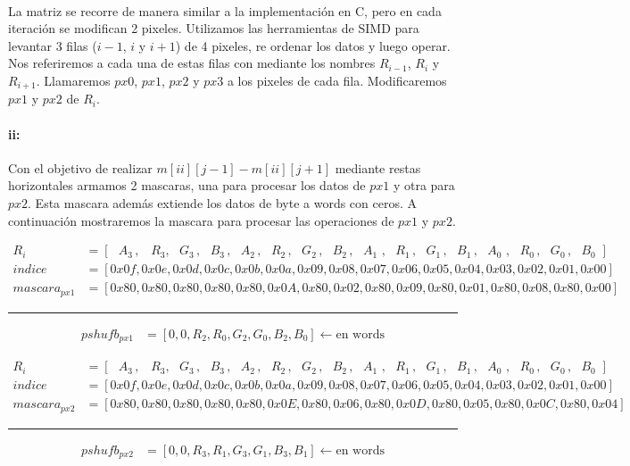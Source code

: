 \documentclass[a4paper]{article}
\begin{document}
\paragraph{} La matriz se recorre de manera similar a la implementaci\'on en C, pero en cada iteraci\'on se modifican 2 pixeles. Utilizamos las herramientas de SIMD para levantar 3 filas ($i-1$, $i$ y $i+1$) de 4 pixeles, re ordenar los datos y luego operar. Nos referiremos a cada una de estas filas con mediante los nombres $R_{i-1}$, $R_i$ y $R_{i+1}$. Llamaremos $px0$, $px1$, $px2$ y $px3$ a los pixeles de cada fila. Modificaremos $px1$ y $px2$ de $R_i$.

\paragraph{ii:} Con el objetivo de realizar $m[ii][j-1] - m[ii][j+1]$ mediante restas horizontales armamos 2 mascaras, una para procesar los datos de $px1$ y otra para $px2$. Esta mascara adem\'as extiende los datos de byte a words con ceros. A continuaci\'on mostraremos la mascara para procesar las operaciones de $px1$ y $px2$.
 


\begin{align*}
	R_i &= [\, \, \, \, A_3 \, ,\, \, \, \, \, R_3 ,\, \, \, \, G_3 \, ,\, \, \, \, B_3 \, ,\, \, \, \, A_2 \, ,\, \, \, \, R_2 \, ,\, \, \, \, G_2 \, ,\, \, \, \, B_2 \, , \, \, \, \,  A_1 \, \, , \, \, \, \, R_1 \, , \, \, \, \, G_1 \, , \, \, \, \, B_1 \, , \, \, \, \, A_0 \, \, , \, \, \, \, R_0 \, , \, \, \, \, G_0 \, , \, \, \, \, B_0 \, \,]\\
	indice &= [0x0f, 0x0e, 0x0d, 0x0c, 0x0b, 0x0a, 0x09, 0x08, 0x07, 0x06, 0x05, 0x04, 0x03, 0x02, 0x01, 0x00]\\
	mascara_{px1} &= [0x80, 0x80, 0x80, 0x80, 0x80, 0x0A, 0x80, 0x02, 0x80, 0x09, 0x80, 0x01, 0x80, 0x08, 0x80, 0x00] 
\end{align*}
\hrule
\begin{align*}
	pshufb_{px1} &= [0, 0, R_2, R_0, G_2, G_0, B_2, B_0] \leftarrow \text{en words}
\end{align*} 


\begin{align*}
	R_i &= [\, \, \, \, A_3 \, ,\, \, \, \, \, R_3 ,\, \, \, \, G_3 \, ,\, \, \, \, B_3 \, ,\, \, \, \, A_2 \, ,\, \, \, \, R_2 \, ,\, \, \, \, G_2 \, ,\, \, \, \, B_2 \, , \, \, \, \,  A_1 \, \, , \, \, \, \, R_1 \, , \, \, \, \, G_1 \, , \, \, \, \, B_1 \, , \, \, \, \, A_0 \, \, , \, \, \, \, R_0 \, , \, \, \, \, G_0 \, , \, \, \, \, B_0 \, \,]\\
	indice &= [0x0f, 0x0e, 0x0d, 0x0c, 0x0b, 0x0a, 0x09, 0x08, 0x07, 0x06, 0x05, 0x04, 0x03, 0x02, 0x01, 0x00]\\
	mascara_{px2} &= [0x80, 0x80, 0x80, 0x80, 0x80, 0x0E, 0x80, 0x06, 0x80, 0x0D, 0x80, 0x05, 0x80, 0x0C, 0x80, 0x04] 
\end{align*}
\hrule
\begin{align*}
	pshufb_{px2} &= [0, 0, R_3, R_1, G_3, G_1, B_3, B_1] \leftarrow \text{en words}
\end{align*} 
\end{document}
